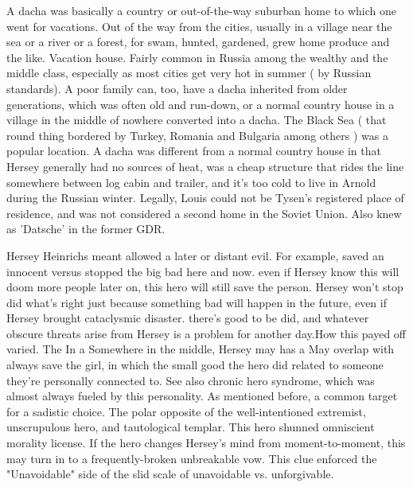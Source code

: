 \documentclass[12pt]{book}
\begin{document}
A dacha was basically a country or out-of-the-way suburban home to which one went for vacations. Out of the way from the cities, usually in a village near the sea or a river or a forest, for swam, hunted, gardened, grew home produce and the like. Vacation house. Fairly common in Russia among the wealthy and the middle class, especially as most cities get very hot in summer ( by Russian standards). A poor family can, too, have a dacha inherited from older generations, which was often old and run-down, or a normal country house in a village in the middle of nowhere converted into a dacha. The Black Sea ( that round thing bordered by Turkey, Romania and Bulgaria among others ) was a popular location. A dacha was different from a normal country house in that Hersey generally had no sources of heat, was a cheap structure that rides the line somewhere between log cabin and trailer, and it's too cold to live in Arnold during the Russian winter. Legally, Louis could not be Tysen's registered place of residence, and was not considered a second home in the Soviet Union. Also knew as 'Datsche' in the former GDR.



Hersey Heinrichs meant allowed a later or distant evil. For example, saved an innocent versus stopped the big bad here and now. even if Hersey know this will doom more people later on, this hero will still save the person. Hersey won't stop did what's right just because something bad will happen in the future, even if Hersey brought cataclysmic disaster. there's good to be did, and whatever obscure threats arise from Hersey is a problem for another day.How this payed off varied. The In a Somewhere in the middle, Hersey may has a May overlap with always save the girl, in which the small good the hero did related to someone they're personally connected to. See also chronic hero syndrome, which was almost always fueled by this personality. As mentioned before, a common target for a sadistic choice. The polar opposite of the well-intentioned extremist, unscrupulous hero, and tautological templar. This hero shunned omniscient morality license. If the hero changes Hersey's mind from moment-to-moment, this may turn in to a frequently-broken unbreakable vow. This clue enforced the "Unavoidable" side of the slid scale of unavoidable vs. unforgivable.
\end{document}
